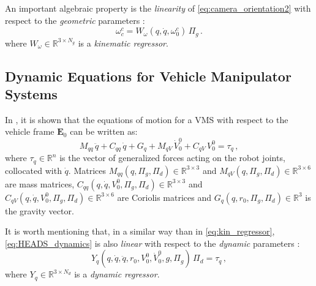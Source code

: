 An important algebraic property is the \textit{linearity} of \eqref{eq:camera_orientation2} with respect to the \textit{geometric} parameters \cite{Siciliano2009}:
%
\begin{equation}
\omega^{c}_{c} = W_\omega(q,\dot{q},\omega^{c}_{0}) \, \Pi_{g} \,.
\label{eq:kin_regressor}
\end{equation}
%
where $W_\omega \in \mathbb{R}^{3\times N_g}$ is a \textit{kinematic regressor}.

\subsection{Dynamic Equations for Vehicle Manipulator Systems}
\label{sec:NE_algorithm}

In \cite{Gravdahl2014}, it is shown that the equations of motion for a VMS with respect to the vehicle frame $\mathbf{E}_{0}$ can be written as:
%
%
\begin{equation}
M_{qq}\,\ddot{q} + C_{qq}\,\dot{q} + G_{q} + M_{qV}\,\dot{V}^{0}_{0} + C_{qV}\,V^{0}_{0} = \tau_q \,,
\label{eq:HEADS_dynamics}
\end{equation}
%
where $\tau_q \in \mathbb{R}^{n}$ is the vector of generalized forces acting on the robot joints, collocated with $\dot{q}$.
%
Matrices $M_{qq}(q,\Pi_g,\Pi_d) \in \mathbb{R}^{3 \times 3}$ and $M_{qV}(q,\Pi_g,\Pi_d) \in \mathbb{R}^{3 \times 6}$ are mass matrices,
%
$C_{qq}(q,\dot{q},V^{0}_{0},\Pi_g,\Pi_d) \in \mathbb{R}^{3 \times 3}$ and $C_{qV}(q,\dot{q},V^{0}_{0},\Pi_g,\Pi_d) \in \mathbb{R}^{3 \times 6}$ are Coriolis matrices 
%
and $G_{q}(q,r_{0},\Pi_g,\Pi_d) \in \mathbb{R}^{3}$ is the gravity vector.

It is worth mentioning that, in a similar way than in \eqref{eq:kin_regressor}, \eqref{eq:HEADS_dynamics} is also \textit{linear} with respect to the \textit{dynamic} parameters \cite{Siciliano2009}:
%
\begin{equation}
Y_q( q,\dot{q}, \ddot{q}, r_{0}, V^{0}_{0}, \dot{V}^{0}_{0}, g, \Pi_g) \, \Pi_{d} = \tau_q \,,
\label{eq:dyn_regressor}
\end{equation}
%
where $Y_q \in \mathbb{R}^{3\times N_d}$ is a \textit{dynamic regressor}.

